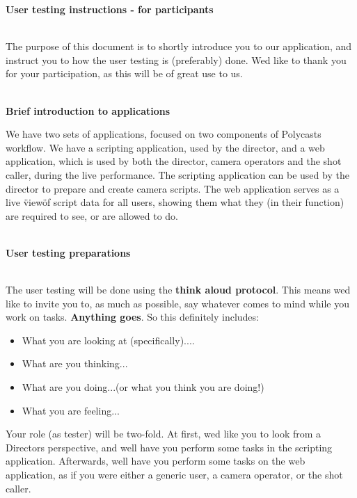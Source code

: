 \begin{Large}
\textbf{User testing instructions - for participants}\\\\
\end{Large}
The purpose of this document is to shortly introduce you to our application, and instruct you to how the user testing is (preferably) done. We\textquotesingle d like to thank you for your participation, as this will be of great use to us.\\\\
\begin{large}
\textbf{Brief introduction to applications}\\
\end{large}
We have two sets of applications, focused on two components of Polycast\textquotesingle s workflow. We have a scripting application, used by the director, and a web application, which is used by both the director, camera operators and the shot caller, during the live performance. The scripting application can be used by the director to prepare and create camera scripts. The web application serves as a live \"view\" of script data for all users, showing them what they (in their function) are required to see, or are allowed to do.\\\\
\begin{large}
\textbf{User testing preparations}\\\\
\end{large}
The user testing will be done using the \textbf{think aloud protocol}. This means we\textquotesingle d like to invite you to, as much as possible, say whatever comes to mind while you work on tasks. \textbf{Anything goes}. So this definitely includes:\\
\begin{itemize}
\item What you are looking at (specifically)....
\item What are you thinking...
\item What are you doing...(or what you think you are doing!)
\item What you are feeling...
\end{itemize}
Your role (as tester) will be two-fold. At first, we\textquotesingle d like you to look from a Director\textquotesingle s perspective, and we\textquotesingle ll have you perform some tasks in the scripting application. Afterwards, we\textquotesingle ll have you perform some tasks on the web application, as if you were either a generic user, a camera operator, or the shot caller.\\\\
